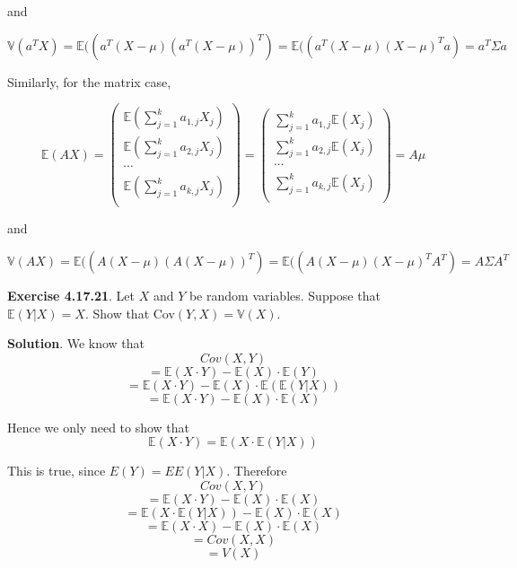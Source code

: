 and

\[ \mathbb{V}(a^T X) = \mathbb{E}((a^T (X - \mu) (a^T(X - \mu))^T) = \mathbb{E}((a^T (X - \mu) (X - \mu)^T a) = a^T \Sigma a \]

Similarly, for the matrix case,

\[ \mathbb{E}(AX) = \begin{pmatrix}
\mathbb{E}\left( \sum_{j=1}^k a_{1, j} X_j \right) \\
\mathbb{E}\left( \sum_{j=1}^k a_{2, j} X_j \right) \\
\cdots \\
\mathbb{E}\left( \sum_{j=1}^k a_{k, j} X_j \right) \\
\end{pmatrix} = \begin{pmatrix}
\sum_{j=1}^k a_{1, j} \mathbb{E}(X_j) \\
\sum_{j=1}^k a_{2, j} \mathbb{E}(X_j) \\
\cdots \\
\sum_{j=1}^k a_{k, j} \mathbb{E}(X_j) \\
\end{pmatrix} = A \mu \]

and

\[ \mathbb{V}(A X) = \mathbb{E}((A (X - \mu) (A(X - \mu))^T) = \mathbb{E}((A (X - \mu) (X - \mu)^T A^T) = A \Sigma A^T \]

\textbf{Exercise 4.17.21}. Let \(X\) and \(Y\) be random variables.
Suppose that \(\mathbb{E}(Y|X) = X\). Show that
Cov\((Y, X) = \mathbb{V}(X)\).

\textbf{Solution}. We know that \[Cov(X, Y)\]
\[= \mathbb{E}(X \cdot Y) - \mathbb{E}(X) \cdot \mathbb{E}(Y)\]
\[= \mathbb{E}(X \cdot Y) - \mathbb{E}(X) \cdot \mathbb{E}(\mathbb{E}(Y|X))\]
\[= \mathbb{E}(X\cdot Y) - \mathbb{E}(X) \cdot \mathbb{E}(X)\]

Hence we only need to show that
\[\mathbb{E}(X\cdot Y) = \mathbb{E}(X \cdot \mathbb{E}(Y|X))\]

This is true, since \(E(Y) = EE(Y|X)\). Therefore \[Cov(X, Y)\]
\[= \mathbb{E}(X\cdot Y) -  \mathbb{E}(X) \cdot \mathbb{E}(X)\]
\[= \mathbb{E}(X \cdot \mathbb{E}(Y|X)) -  \mathbb{E}(X) \cdot \mathbb{E}(X)\]
\[= \mathbb{E}(X\cdot X) -  \mathbb{E}(X) \cdot \mathbb{E}(X)\]
\[= Cov(X, X)\] \[= V(X)\]

